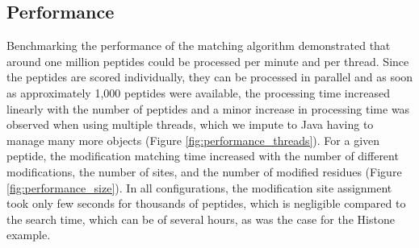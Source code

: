 \documentclass[]{article}
\begin{document}
 

\subsection{Performance}

Benchmarking the performance of the matching algorithm demonstrated that around one million peptides could be processed per minute and per thread. Since the peptides are scored individually, they can be processed in parallel and as soon as approximately 1,000 peptides were available, the processing time increased linearly with the number of peptides and a minor increase in processing time was observed when using multiple threads, which we impute to Java having to manage many more objects (Figure \ref{fig:performance_threads}). For a given peptide, the modification matching time increased with the number of different modifications, the number of sites, and the number of modified residues (Figure \ref{fig:performance_size}). In all configurations, the modification site assignment took only few seconds for thousands of peptides, which is negligible compared to the search time, which can be of several hours, as was the case for the Histone example.



\end{document}

